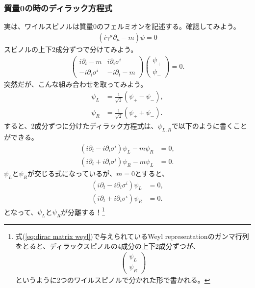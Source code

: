 \documentclass[10pt,a4paper]{jarticle}
\begin{document}
\subsubsection{質量0の時のディラック方程式}
実は、ワイルスピノルは質量$0$のフェルミオンを記述する。確認してみよう。
\begin{align}
(i \gamma^\mu \partial_\mu -m )\psi = 0
\end{align}
スピノルの上下2成分ずつで分けてみよう。
\begin{align}
\left(\begin{array}{cc}
i\partial_t - m & i \partial_i \sigma^i \\
-i \partial_i \sigma^i & -i\partial_t - m
\end{array}\right) \left(
\begin{array}{c}
\psi_+ \\
\psi_-
\end{array}
\right) = 0.
\end{align}
%
突然だが、こんな組み合わせを取ってみよう。
\begin{align}
\psi_L &= \frac{1}{\sqrt{2}} (\psi_+ - \psi_-), \\
\psi_R &= \frac{1}{\sqrt{2}} (\psi_+ + \psi_-).
\end{align}
%
すると、2成分ずつに分けたディラック方程式は、$\psi_{L,R}$で以下のように書くことができる。
\begin{align}
(i\partial_t - i \partial_i \sigma^i) \psi_L - m \psi_R &= 0, \\
(i\partial_t + i \partial_i \sigma^i) \psi_R - m \psi_L &= 0.
\end{align}
$\psi_L$と$\psi_R$が交じる式になっているが、$m=0$とすると、
\begin{align}
(i\partial_t - i \partial_i \sigma^i) \psi_L &= 0, \\
(i\partial_t + i \partial_i \sigma^i) \psi_R &= 0.
\end{align}
となって、$\psi_L$と$\psi_R$が分離する！\footnote{
式(\ref{eq:dirac matrix weyl})で与えられているWeyl representationのガンマ行列をとると、ディラックスピノルの4成分の上下2成分ずつが、
\begin{align}
\left(\begin{array}{c}
\psi_L \\
\psi_R
\end{array}\right)
\end{align}
というように2つのワイルスピノルで分かれた形で書かれる。}
\end{document}
